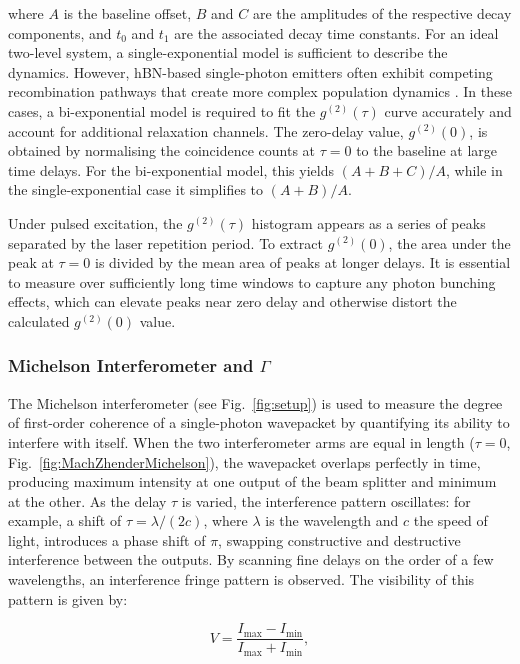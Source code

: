 where $A$ is the baseline offset, $B$ and $C$ are the amplitudes of the respective decay components, and $t_0$ and $t_1$ are the associated decay time constants. For an ideal two-level system, a single-exponential model is sufficient to describe the dynamics. However, hBN-based single-photon emitters often exhibit competing recombination pathways that create more complex population dynamics \cite{Boll2020}. In these cases, a bi-exponential model is required to fit the $g^{(2)}(\tau)$ curve accurately and account for additional relaxation channels. The zero-delay value, $g^{(2)}(0)$, is obtained by normalising the coincidence counts at $\tau=0$ to the baseline at large time delays. For the bi-exponential model, this yields $(A + B + C)/A$, while in the single-exponential case it simplifies to $(A + B)/A$.

Under pulsed excitation, the $g^{(2)}(\tau)$ histogram appears as a series of peaks separated by the laser repetition period. To extract $g^{(2)}(0)$, the area under the peak at $\tau=0$ is divided by the mean area of peaks at longer delays. It is essential to measure over sufficiently long time windows to capture any photon bunching effects, which can elevate peaks near zero delay and otherwise distort the calculated $g^{(2)}(0)$ value.


\subsubsection[Michelson Interferometer and Dephasing Rate]{Michelson Interferometer and $\Gamma$}

The Michelson interferometer (see Fig.~\ref{fig:setup}) is used to measure the degree of first-order coherence of a single-photon wavepacket by quantifying its ability to interfere with itself. When the two interferometer arms are equal in length ($\tau=0$, Fig.~\ref{fig:MachZhenderMichelson}), the wavepacket overlaps perfectly in time, producing maximum intensity at one output of the beam splitter and minimum at the other. As the delay $\tau$ is varied, the interference pattern oscillates: for example, a shift of $\tau=\lambda/(2c)$, where $\lambda$ is the wavelength and $c$ the speed of light, introduces a phase shift of $\pi$, swapping constructive and destructive interference between the outputs. By scanning fine delays on the order of a few wavelengths, an interference fringe pattern is observed. The visibility of this pattern is given by:

\begin{equation}
    V = \frac{I_\text{max} - I_\text{min}}{I_\text{max} + I_\text{min}},
    \label{eqn:vis}
\end{equation}

